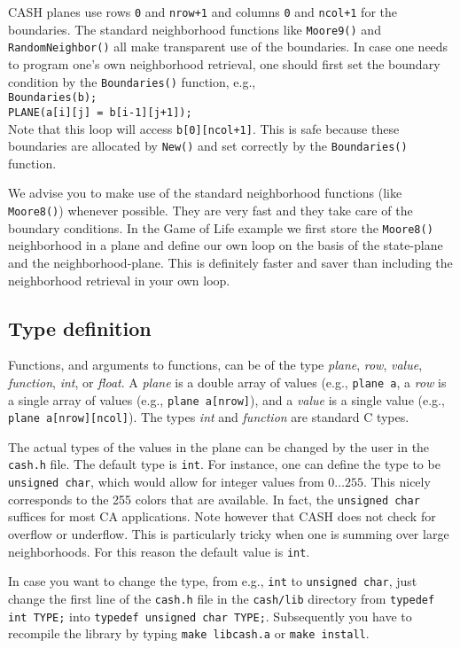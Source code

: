 \documentclass[12pt]{article}
\newcommand{\mtt}[1]{\texttt{\\#1\\}}
\begin{document}
CASH planes use rows {\tt 0} and {\tt nrow+1} 
and columns {\tt 0} and {\tt ncol+1}
for the boundaries.
The standard neighborhood functions like {\tt Moore9()} and
{\tt RandomNeighbor()} all make transparent use of the boundaries.
In case one needs to program one's own neighborhood
retrieval, one should first set the boundary condition
by the {\tt Boundaries()} function, e.g.,
\mtt{Boundaries(b);\\PLANE(a[i][j] = b[i-1][j+1]);}
Note that this loop will access {\tt b[0][ncol+1]}. 
This is safe because these boundaries are allocated by {\tt New()} 
and set correctly by the {\tt Boundaries()} function.

We advise you to make use of the standard neighborhood functions 
(like {\tt Moore8()}) whenever possible. 
They are very fast and they take care of the boundary conditions.
In the Game of Life example we first store the {\tt Moore8()}
neighborhood in a plane and define our own loop on the basis of 
the state-plane and the neighborhood-plane.
This is definitely faster and saver than including the neighborhood
retrieval in your own loop. 

\subsection{Type definition}
Functions, and arguments to functions, can be of the type {\sl plane}, 
{\sl row}, {\sl value},
{\sl function}, {\sl int}, or {\sl float}. 
A {\sl plane} is a double array of
values (e.g., {\tt plane a}, a {\sl row} is a single array of
values (e.g., {\tt plane a[nrow]}), and a {\sl value} is a single value
(e.g., {\tt plane a[nrow][ncol]}). The types {\sl int} and {\sl function} are standard
C types. 

The actual types of the values in the plane can be changed by the
user in the {\tt cash.h} file. The default type is {\tt int}.
For instance, one can define the type to be {\tt unsigned char},
which would allow for integer values from $0\dots255$.
This nicely corresponds to the 255 colors that are available.
In fact, the {\tt unsigned char} suffices for most CA applications.
Note however that CASH does not check for overflow or underflow. 
This is particularly tricky when one is summing over large
neighborhoods. For this reason the default value is {\tt int}. 

In case you want to change the type,
from e.g., {\tt int} to  {\tt unsigned char},
just change the first line of the {\tt cash.h} file in
the {\tt cash/lib} directory from
{\tt typedef int TYPE;} into {\tt typedef unsigned char TYPE;}.
Subsequently you have to recompile the library by typing
{\tt make libcash.a} or {\tt make install}.
\end{document}
